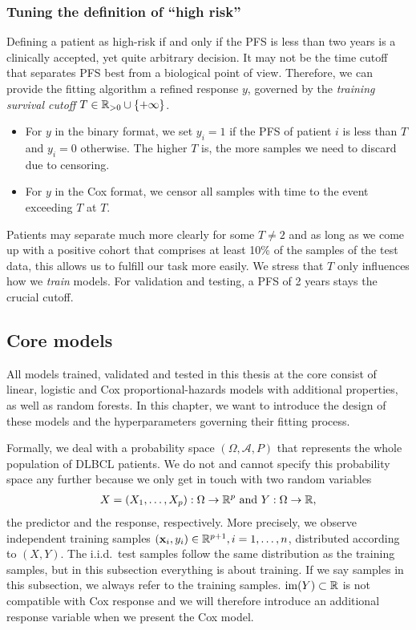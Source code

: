 \subsubsection{Tuning the definition of ``high risk''}

Defining a patient as high-risk if and only if the PFS is less than two years
is a clinically accepted, yet quite arbitrary decision. It may not be the time cutoff that 
separates PFS best from a biological point of view. Therefore, we can provide the fitting 
algorithm a refined response $y$, governed by the \textit{training survival cutoff} $T \in 
\mathbb{R}_{> 0} \cup \{ +\infty \}$.
\begin{itemize}
    \item For $y$ in the binary format, we set $y_i = 1$ if the PFS 
        of patient $i$ is less than $T$ and $y_i = 0$ otherwise. The higher $T$ is, the more 
        samples we need to discard due to censoring.
    \item For $y$ in the Cox format, we censor all samples with time to the event exceeding $T$ at 
        $T$.
\end{itemize}
Patients may separate much more clearly for some $T \neq 2$ and as long as we come up 
with a positive cohort that comprises at least \num{10}\% of the samples of the test data, this 
allows us to fulfill our task more easily. We stress that $T$ only influences how we \textit{train} models. 
For validation and testing, a PFS of \num{2} years stays the crucial cutoff.

\subsection{Core models}\label{subsec:core-models}

All models trained, validated and tested in this thesis at the core consist of linear, 
logistic and Cox proportional-hazards models with additional properties, as well as random forests.
In this chapter, we want to introduce the design of these models and the hyperparameters governing 
their fitting process.

Formally, we deal with a probability space $(\Omega, \mathcal{A}, P)$ that represents the whole 
population of DLBCL patients. We do not and cannot specify this probability space any further because 
we only get in touch with two random variables 
\begin{align}
    X = (X_1, \ldots, X_p): \Omega \to \mathbb{R}^p \text{ and } Y: \Omega \to \mathbb{R},
\end{align}
the predictor and the response, respectively. More 
precisely, we observe independent training samples $(\mathbf{x}_i, y_i) \in \mathbb{R}^{p+1}, i = 1, \ldots, n$, 
distributed according to $(X, Y)$. The i.i.d.\ test samples follow the same 
distribution as the training samples, but in this subsection everything is about training. If we 
say samples in this subsection, we always refer to the training samples. $\mathrm{im}(Y) \subset \mathbb{R}$ is 
not compatible with Cox response and we will therefore introduce an additional response variable when 
we present the Cox model.

